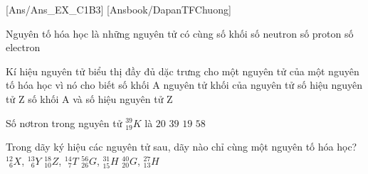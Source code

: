 \documentclass[Main.tex]{subfiles}
\begin{document}
\setcounter{secnumdepth}{4} %
\titlespacing*{\subsubsection}{0cm}{0pt}{0pt}
\titlespacing*{\paragraph}{0cm}{0pt}{0pt}
[Ans/Ans_EX_C1B3]
[Ansbook/DapanTFChuong]
\hienthiloigiaiex
\hienthiloigiaibt
\begin{ex}
	Nguyên tố hóa học là những nguyên tử có cùng
	\choice
	{số khối}
	{số neutron}
	{\True số proton}
	{số electron}
\end{ex}
\begin{ex}
	Kí hiệu nguyên tử biểu thị đầy đủ dặc trưng cho một nguyên tử của một nguyên tố hóa học vì nó cho biết
	\choice
	{số khối A}
	{nguyên tử khối của nguyên tử}
	{số hiệu nguyên tử Z}
	{\True số khối A và số hiệu nguyên tử Z}
\end{ex}
\begin{ex}
	Số nơtron trong nguyên tử ${}^{39}_{19}K$ là
	\choice
	{\True$20$}
	{$39$}
	{$19$}
	{$58$}
\end{ex}
\begin{ex}
	Trong dãy ký hiệu các nguyên tử sau, dãy nào chỉ cùng một nguyên tố hóa học?
	\choice
	{\True ${}^{12}_{\phantom{0}6}X$, ${}^{13}_{\phantom{0}6}Y$}
	{${}^{18}_{10}Z$, ${}^{14}_{\phantom{0}7}T$}
	{${}^{56}_{26}G$, ${}^{31}_{15}H$}
	{${}^{40}_{20}G$, ${}^{27}_{13}H$}
\end{ex}
\end{document}
